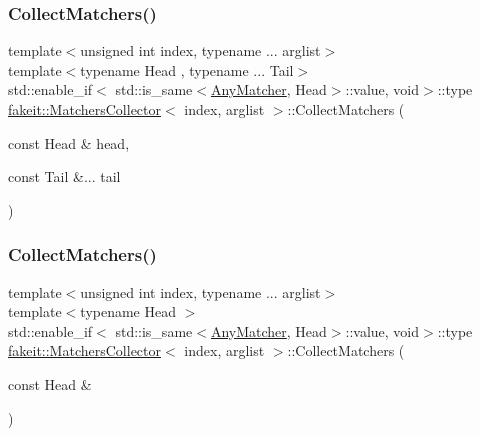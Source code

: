 \subsubsection{\texorpdfstring{CollectMatchers()}{CollectMatchers()}\hspace{0.1cm}{\footnotesize\ttfamily [47/63]}}
{\footnotesize\ttfamily template$<$unsigned int index, typename ... arglist$>$ \\
template$<$typename Head , typename ... Tail$>$ \\
std\+::enable\+\_\+if$<$ std\+::is\+\_\+same$<$\mbox{\hyperlink{structfakeit_1_1AnyMatcher}{Any\+Matcher}}, Head$>$\+::value, void$>$\+::type \mbox{\hyperlink{classfakeit_1_1MatchersCollector}{fakeit\+::\+Matchers\+Collector}}$<$ index, arglist $>$\+::Collect\+Matchers (\begin{DoxyParamCaption}\item[{const Head \&}]{head,  }\item[{const Tail \&...}]{tail }\end{DoxyParamCaption})\hspace{0.3cm}{\ttfamily [inline]}}

\mbox{\label{classfakeit_1_1MatchersCollector_a89350af9ba2e7aaead8bd7b007f03631}} 
\subsubsection{\texorpdfstring{CollectMatchers()}{CollectMatchers()}\hspace{0.1cm}{\footnotesize\ttfamily [48/63]}}
{\footnotesize\ttfamily template$<$unsigned int index, typename ... arglist$>$ \\
template$<$typename Head $>$ \\
std\+::enable\+\_\+if$<$ std\+::is\+\_\+same$<$\mbox{\hyperlink{structfakeit_1_1AnyMatcher}{Any\+Matcher}}, Head$>$\+::value, void$>$\+::type \mbox{\hyperlink{classfakeit_1_1MatchersCollector}{fakeit\+::\+Matchers\+Collector}}$<$ index, arglist $>$\+::Collect\+Matchers (\begin{DoxyParamCaption}\item[{const Head \&}]{ }\end{DoxyParamCaption})\hspace{0.3cm}{\ttfamily [inline]}}

